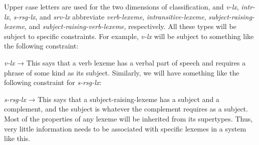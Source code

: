 \documentclass[output=paper]{langsci/langscibook}
\begin{document}
\ea\label{ex:key:4.2}
\z
%
Upper case letters are used for the two dimensions of classification, and \emph{v-lx}, \emph{intr-lx}, \emph{s-rsg-lx}, and \emph{srv-lx} abbreviate \emph{verb-lexeme}, \emph{intransitive-lexeme}, \emph{subject-raising-lexeme}, and \emph{subject-raising-verb-lexeme}, respectively. All these types will be subject to specific constraints. For example, \emph{v-lx} will be subject to something like the following constraint:

\ea\label{ex:key:4.3}
    \emph{v-lx} → 
\z
%
This says that a verb lexeme has a verbal part of speech and requires a phrase of some kind as its subject. Similarly, we will have something like the following constraint for \emph{s-rsg-lx}:

\ea\label{ex:key:4.4}
    \emph{s-rsg-lx} →   
\z
%
This says that a subject-raising-lexeme has a subject and a complement, and the
subject is whatever the complement requires as a subject. Most of the
properties of any lexeme will be inherited from its supertypes. Thus, very
little information needs to be associated with specific lexemes in a system
like this.
\end{document}
